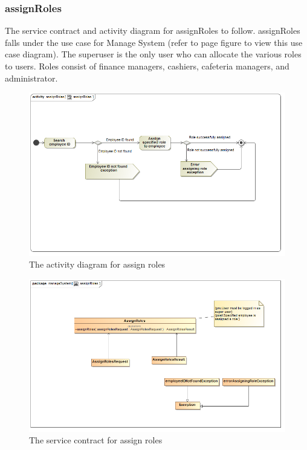 \documentclass[a4paper,12pt]{article}
\begin{document}
\subsubsection{assignRoles}
The service contract and activity diagram for assignRoles to follow. assignRoles falls under the use case for Manage System (refer to page   figure   to view this use case diagram). The superuser is the only user who can allocate the various roles to users. Roles consist of finance managers, cashiers, cafeteria managers, and administrator. 
\begin{figure}[H]
  \centering
    \includegraphics[width=1.0\textwidth]{../images/assignRolesActivityDiagram.png}
    \caption{The activity diagram for assign roles} 
\end{figure}

\begin{figure}[H]
	\centering
	\includegraphics[width=1.0\textwidth]{../images/assignRolesServiceContract.png}
	\caption{The service contract for assign roles}
\end{figure}
\end{document}

